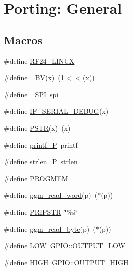 \hypertarget{group__Porting__General}{}\section{Porting\+: General}
\label{group__Porting__General}
\subsection*{Macros}
\begin{DoxyCompactItemize}
\item 
\#define \hyperlink{group__Porting__General_gac9c625ddccaf6226fc77d5d903d160e9}{R\+F24\+\_\+\+L\+I\+N\+UX}
\item 
\#define \hyperlink{group__Porting__General_ga483c9de27db573099572f5485ef841c9}{\+\_\+\+BV}(x)~(1$<$$<$(x))
\item 
\#define \hyperlink{group__Porting__General_gaa9e44ba356b97be27806db7f96ff527d}{\+\_\+\+S\+PI}~spi
\item 
\#define \hyperlink{group__Porting__General_gab2cf239a98bc5d0beee4ceb41a5dd549}{I\+F\+\_\+\+S\+E\+R\+I\+A\+L\+\_\+\+D\+E\+B\+UG}(x)
\item 
\#define \hyperlink{group__Porting__General_ga9c00057fd19e916cc1aa0a5949336beb}{P\+S\+TR}(x)~(x)
\item 
\#define \hyperlink{group__Porting__General_ga758ad569cbda7c5ddfaa902e8eed3360}{printf\+\_\+P}~printf
\item 
\#define \hyperlink{group__Porting__General_ga05dde754db9944c90362c1f861d358ba}{strlen\+\_\+P}~strlen
\item 
\#define \hyperlink{group__Porting__General_ga75acaba9e781937468d0911423bc0c35}{P\+R\+O\+G\+M\+EM}
\item 
\#define \hyperlink{group__Porting__General_gaa59a94d7ea755db0d7811b543253ebc4}{pgm\+\_\+read\+\_\+word}(p)~($\ast$(p))
\item 
\#define \hyperlink{group__Porting__General_ga7642e6d60f41fc769b32962c8c513668}{P\+R\+I\+P\+S\+TR}~\char`\"{}\%s\char`\"{}
\item 
\#define \hyperlink{group__Porting__General_gae6778ca2c38951f24bd39f9c38cab9b2}{pgm\+\_\+read\+\_\+byte}(p)~($\ast$(p))
\item 
\#define \hyperlink{group__Porting__General_gab811d8c6ff3a505312d3276590444289}{L\+OW}~\hyperlink{group__Porting__GPIO_gaa29a50f0f8fc0a62076c7f4bc7dc70db}{G\+P\+I\+O\+::\+O\+U\+T\+P\+U\+T\+\_\+\+L\+OW}
\item 
\#define \hyperlink{group__Porting__General_ga5bb885982ff66a2e0a0a45a8ee9c35e2}{H\+I\+GH}~\hyperlink{group__Porting__GPIO_ga18fd76f29528fc97aadcdb78495ff6bf}{G\+P\+I\+O\+::\+O\+U\+T\+P\+U\+T\+\_\+\+H\+I\+GH}
$$
\end{DoxyCompactItemize}
